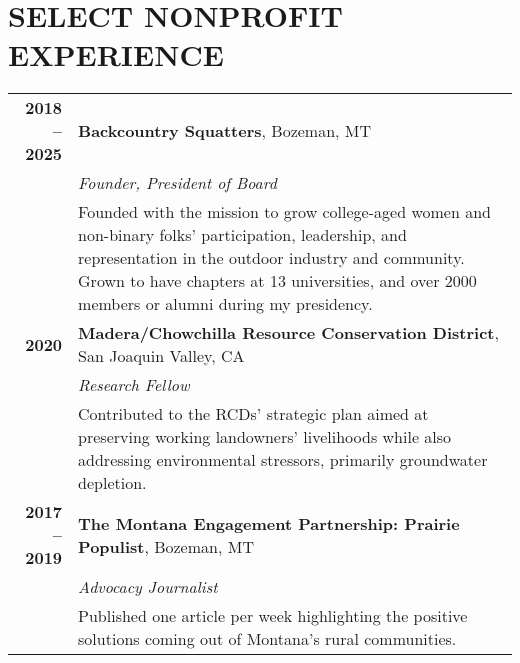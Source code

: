 \documentclass[11pt]{article}
\begin{document}
\section*{SELECT NONPROFIT EXPERIENCE}
\begin{longtable}{>{\bfseries}r p{5.5in}}%
2018 – 2025 & \textbf{Backcountry Squatters}, Bozeman, MT \\
    & \textit{Founder, President of Board} \\
    & Founded with the mission to grow college-aged women and non-binary folks’ participation, leadership, and representation in the outdoor industry and community. Grown to have chapters at 13 universities, and over 2000 members or alumni during my presidency. \\
2020 & \textbf{Madera/Chowchilla Resource Conservation District}, San Joaquin Valley, CA \\
    & \textit{Research Fellow}\\
    & Contributed to the RCDs’ strategic plan aimed at preserving working landowners’ livelihoods while also addressing environmental stressors, primarily groundwater depletion. \\
2017 – 2019 & \textbf{The Montana Engagement Partnership: Prairie Populist}, Bozeman, MT \\
    & \textit{Advocacy Journalist} \\
    & Published one article per week highlighting the positive solutions coming out of Montana’s rural communities. \\[1ex]
\end{longtable}
\end{document}
